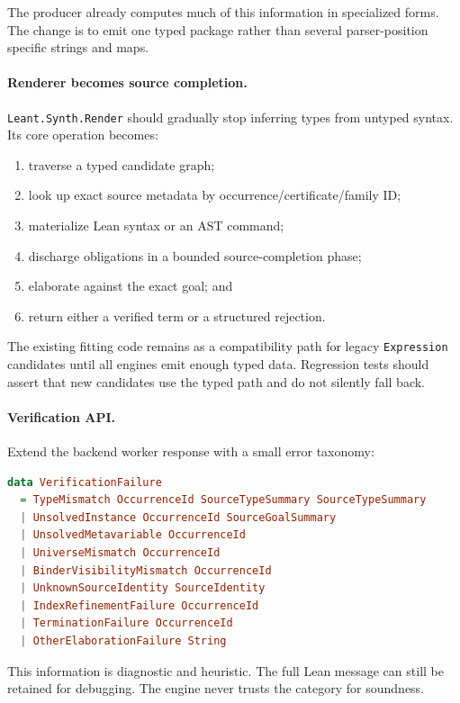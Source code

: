 \documentclass[11pt]{article}
\newcommand{\code}[1]{\texttt{#1}}
\begin{document}
The producer already computes much of this information in specialized forms.
The change is to emit one typed package rather than several parser-position
specific strings and maps.

\paragraph{Renderer becomes source completion.}

\code{Leant.Synth.Render} should gradually stop inferring types from untyped
syntax.  Its core operation becomes:

\begin{enumerate}
  \item traverse a typed candidate graph;
  \item look up exact source metadata by occurrence/certificate/family ID;
  \item materialize Lean syntax or an AST command;
  \item discharge obligations in a bounded source-completion phase;
  \item elaborate against the exact goal; and
  \item return either a verified term or a structured rejection.
\end{enumerate}

The existing fitting code remains as a compatibility path for legacy
\code{Expression} candidates until all engines emit enough typed data.
Regression tests should assert that new candidates use the typed path and do
not silently fall back.

\paragraph{Verification API.}

Extend the backend worker response with a small error taxonomy:

\begin{lstlisting}[language=Haskell]
data VerificationFailure
  = TypeMismatch OccurrenceId SourceTypeSummary SourceTypeSummary
  | UnsolvedInstance OccurrenceId SourceGoalSummary
  | UnsolvedMetavariable OccurrenceId
  | UniverseMismatch OccurrenceId
  | BinderVisibilityMismatch OccurrenceId
  | UnknownSourceIdentity SourceIdentity
  | IndexRefinementFailure OccurrenceId
  | TerminationFailure OccurrenceId
  | OtherElaborationFailure String
\end{lstlisting}

This information is diagnostic and heuristic.  The full Lean message can still
be retained for debugging.  The engine never trusts the category for
soundness.
\end{document}
